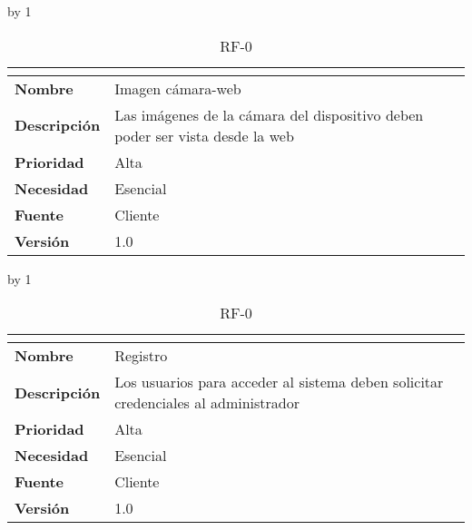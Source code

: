 \advance\rf by 1
\begin{table}[H]
	\caption{RF-0\number\rf}
	\begin{tabular}{|l|p{}|}
		\hline
		\multicolumn{2}{|c|}{\cellcolor[HTML]{BFBFBF}{\color[HTML]{000000} \textbf{RF-0\number\rf}}} \\ \hline
		\textbf{Nombre}      & Imagen cámara-web                                                            \\ \hline
		\textbf{Descripción} & Las imágenes de la cámara del dispositivo deben poder ser vista desde la web \\ \hline
		\textbf{Prioridad}   & Alta                                                                         \\ \hline
		\textbf{Necesidad}   & Esencial                                                                     \\ \hline
		\textbf{Fuente}      & Cliente                                                                      \\ \hline
		\textbf{Versión}     & 1.0                                                                          \\ \hline
	\end{tabular}
\end{table}
\advance\rf by 1
\begin{table}[H]
	\caption{RF-0\number\rf}
	\begin{tabular}{|l|p{}|}
		\hline
		\multicolumn{2}{|c|}{\cellcolor[HTML]{BFBFBF}{\color[HTML]{000000} \textbf{RF-0\number\rf}}} \\ \hline
		\textbf{Nombre}      & Registro                                                                           \\ \hline
		\textbf{Descripción} & Los usuarios para acceder al sistema deben solicitar credenciales al administrador \\ \hline
		\textbf{Prioridad}   & Alta                                                                               \\ \hline
		\textbf{Necesidad}   & Esencial                                                                           \\ \hline
		\textbf{Fuente}      & Cliente                                                                            \\ \hline
		\textbf{Versión}     & 1.0                                                                                \\ \hline
	\end{tabular}
\end{table}
